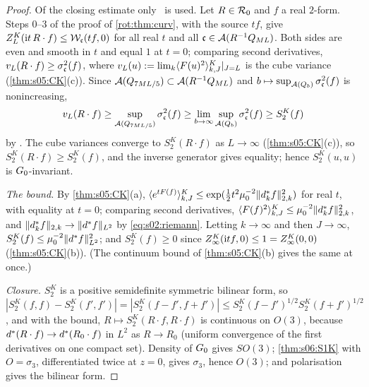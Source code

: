 \begin{proof}
Of the closing estimate only \TItwo\ is used. Let $R\in\mathcal R_0$ and $f$ a real $2$-form. Steps 0--3 of the proof of \cref{rot:thm:curv}, with the source $tf$, give
$Z^K_L(\mathrm it\,R\cdot f)\le\mathcal W_{\mathfrak c}(tf,0)$ for all real $t$ and all $\mathfrak c\in\mathcal A(R^{-1}Q_{ML})$. Both sides are even and smooth in $t$
and equal $1$ at $t=0$; comparing second derivatives, $v_L(R\cdot f)\ge\sigma^2_{\mathfrak c}(f)$, where $v_L(u):=\lim_k\langle F(u)^2\rangle^{K}_{k,J}|_{J=L}$
is the cube variance (\cref{thm:s05:CK}(c)). Since $\mathcal A(Q_{7ML/5})\subset\mathcal A(R^{-1}Q_{ML})$ and $b\mapsto\sup_{\mathcal A(Q_{b})}\sigma^2_{\mathfrak c}(f)$
is nonincreasing,
\[
v_L(R\cdot f)\ge\sup_{\mathcal A(Q_{7ML/5})}\sigma^2_{\mathfrak c}(f)\ge\lim_{b\to\infty}\sup_{\mathcal A(Q_{b})}\sigma^2_{\mathfrak c}(f)\ge S^K_2(f)
\]
by \TItwo. The cube variances converge to $S^K_2(R\cdot f)$ as $L\to\infty$ (\cref{thm:s05:CK}(c)), so $S^K_2(R\cdot f)\ge S^K_2(f)$, and
the inverse generator gives equality; hence $S^K_2(u,u)$ is $G_0$-invariant.

\emph{The bound.} By \cref{thm:s05:CK}(a), $\langle e^{tF(f)}\rangle^{K}_{k,J}\le\exp(\frac12t^2\mu_0^{-2}\lVert d^{*}_kf\rVert^2_{2,k})$ for real $t$, with equality
at $t=0$; comparing second derivatives, $\langle F(f)^2\rangle^{K}_{k,J}\le\mu_0^{-2}\lVert d^{*}_kf\rVert^2_{2,k}$, and $\lVert d^{*}_kf\rVert_{2,k}\to\lVert d^{*} f\rVert_{L^2}$
by \eqref{eq:s02:riemann}. Letting $k\to\infty$ and then $J\to\infty$, $S^K_2(f)\le\mu_0^{-2}\lVert d^{*} f\rVert^2_{L^2}$; and $S^K_2(f)\ge0$
since $Z^{K}_{\infty}(\mathrm itf,0)\le1=Z^{K}_{\infty}(0,0)$ (\cref{thm:s05:CK}(b)). (The continuum bound of \cref{thm:s05:CK}(b) gives the same at once.)

\emph{Closure.} $S^K_2$ is a positive semidefinite symmetric bilinear form, so
$|S^K_2(f,f)-S^K_2(f',f')|=|S^K_2(f-f',f+f')|\le S^K_2(f-f')^{1/2}S^K_2(f+f')^{1/2}$, and with the bound, $R\mapsto S^K_2(R\cdot f,R\cdot f)$
is continuous on $O(3)$, because $d^{*}(R\cdot f)\to d^{*}(R_0\cdot f)$ in $L^2$ as $R\to R_0$ (uniform convergence of the first
derivatives on one compact set). Density of $G_0$ gives $SO(3)$; \cref{thm:s06:S1K} with $O=\sigma_3$, differentiated twice at $z=0$,
gives $\sigma_3$, hence $O(3)$; and polarisation gives the bilinear form.
\end{proof}
